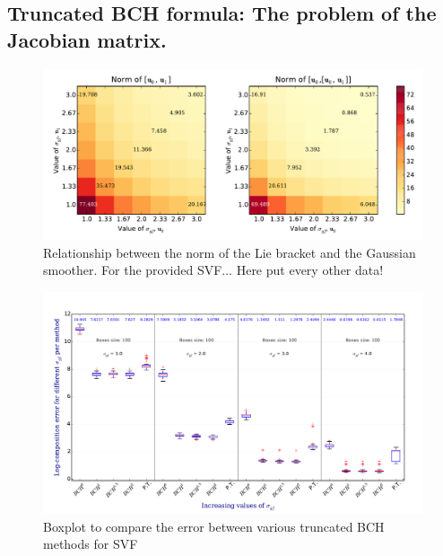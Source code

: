 \subsection{Truncated BCH formula: The problem of the Jacobian matrix.}


\begin{figure}[!ht]
	\hspace{0cm}
	\includegraphics[scale=0.5]{figures/SVF_image_scale_bracket_versus_gaussian.pdf}
	\caption{Relationship between the norm of the Lie bracket and the Gaussian smoother. For the provided SVF... Here put every other data!}
	\label{fig:SVF_image_scale_bracket_versus_gaussian}
\end{figure}


\begin{figure}[!ht]
	\hspace{-0.5cm}
	\includegraphics[scale=0.5]{figures/SVF_boxplot_comparisons_BCH.pdf}
	\caption{Boxplot to compare the error between various truncated BCH methods for SVF}
	\label{fig:SVF_boxplot_comparisons_BCH}
\end{figure}

